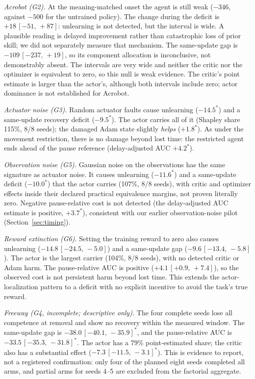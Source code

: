 \documentclass[10pt]{article} %
\newcommand{\sig}{^{\ast}}
\newcommand{\ci}[2]{\,[#1,\,#2]}
\begin{document}
\emph{Acrobot (G2).} At the meaning-matched onset the agent is still weak ($-346$, against $-500$ for the untrained policy). The change during the deficit is $+18\ci{-51}{+87}$: unlearning is not detected, but the interval is wide. A plausible reading is delayed improvement rather than catastrophic loss of prior skill; we did not separately measure that mechanism. The same-update gap is $-109\ci{-237}{+19}$, so its component allocation is inconclusive, not demonstrably absent. The intervals are very wide and neither the critic nor the optimizer is equivalent to zero, so this null is weak evidence. The critic's point estimate is larger than the actor's, although both intervals include zero; actor dominance is not established for Acrobot.

\emph{Actuator noise (G3).} Random actuator faults cause unlearning ($-14.5\sig$) and a same-update recovery deficit ($-9.5\sig$). The actor carries all of it (Shapley share 115\%, 8/8 seeds); the damaged Adam state slightly \emph{helps} ($+1.8\sig$). As under the movement restriction, there is no damage beyond lost time: the restricted agent ends ahead of the pause reference (delay-adjusted AUC $+4.2\sig$).

\emph{Observation noise (G5).} Gaussian noise on the observations has the same signature as actuator noise. It causes unlearning ($-11.6\sig$) and a same-update deficit ($-10.0\sig$) that the actor carries (107\%, 8/8 seeds), with critic and optimizer effects inside their declared practical equivalence margins, not proven literally zero. Negative pause-relative cost is not detected (the delay-adjusted AUC estimate is positive, $+3.7\sig$), consistent with our earlier observation-noise pilot (Section~\ref{sec:timing}).

\emph{Reward extinction (G6).} Setting the training reward to zero also causes unlearning ($-14.8\ci{-24.5}{-5.0}$) and a same-update gap ($-9.6\ci{-13.4}{-5.8}$). The actor is the largest carrier (104\%, 8/8 seeds), with no detected critic or Adam harm. The pause-relative AUC is positive ($+4.1\ci{+0.9}{+7.4}$), so the observed cost is not persistent harm beyond lost time. This extends the actor-localization pattern to a deficit with no explicit incentive to avoid the task's true reward.

\emph{Freeway (G4, incomplete; descriptive only).} The four complete seeds lose all competence at removal and show no recovery within the measured window. The same-update gap is $-38.0\ci{-40.1}{-35.9}\sig$, and the pause-relative AUC is $-33.5\ci{-35.3}{-31.8}\sig$. The actor has a 79\% point-estimated share; the critic also has a substantial effect ($-7.3\ci{-11.5}{-3.1}\sig$). This is evidence to report, not a registered confirmation: only four of the planned eight seeds completed all arms, and partial arms for seeds 4--5 are excluded from the factorial aggregate.
\end{document}
